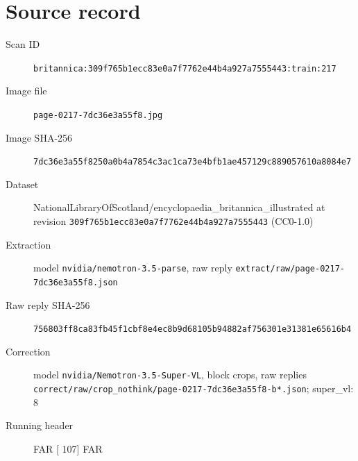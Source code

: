 \documentclass{article}
\begin{document}
\section*{Source record}
\begin{description}
\item[Scan ID] \texttt{britannica:309f765b1ecc83e0a7f7762e44b4a927a7555443:train:217}
\item[Image file] \texttt{page-0217-7dc36e3a55f8.jpg}
\item[Image SHA-256] \texttt{7dc36e3a55f8250a0b4a7854c3ac1ca73e4bfb1ae457129c889057610a8084e7}
\item[Dataset] NationalLibraryOfScotland/encyclopaedia\_britannica\_illustrated at revision \texttt{309f765b1ecc83e0a7f7762e44b4a927a7555443} (CC0-1.0)
\item[Extraction] model \texttt{nvidia/nemotron-3.5-parse}, raw reply \texttt{extract/raw/page-0217-7dc36e3a55f8.json}
\item[Raw reply SHA-256] \texttt{756803ff8ca83fb45f1cbf8e4ec8b9d68105b94882af756301e31381e65616b4}
\item[Correction] model \texttt{nvidia/Nemotron-3.5-Super-VL}, block crops, raw replies \texttt{correct/raw/crop\_nothink/page-0217-7dc36e3a55f8-b*.json}; super\_vl: 8
\item[Running header] FAR [ 107] FAR
\end{description}
\end{document}
